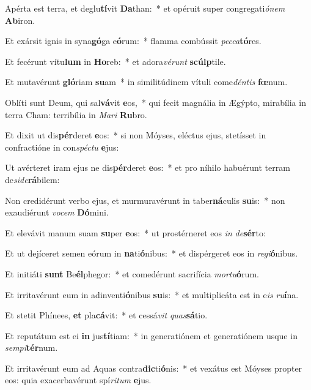 \item Apérta est terra, et deglu\textbf{tí}vit \textbf{Da}than:~* et opéruit super congregati\textit{ó}\textit{nem} \textbf{Ab}iron.
\item Et exársit ignis in syna\textbf{gó}ga e\textbf{ó}rum:~* flamma combússit \textit{pec}\textit{ca}\textbf{tó}res.
\item Et fecérunt vítu\textbf{lum} in \textbf{Ho}reb:~* et adora\textit{vé}\textit{runt} \textbf{scúlp}tile.
\item Et mutavérunt \textbf{gló}riam \textbf{su}am~* in similitúdinem vítuli come\textit{dén}\textit{tis} \textbf{fœ}num.
\item Oblíti sunt Deum, qui sal\textbf{vá}vit \textbf{e}os,~* qui fecit magnália in Ægýpto, mirabília in terra Cham: terribília in \textit{Ma}\textit{ri} \textbf{Ru}bro.
\item Et dixit ut dis\textbf{pér}deret \textbf{e}os:~* si non Móyses, eléctus ejus, stetísset in confractióne in con\textit{spéc}\textit{tu} \textbf{e}jus:
\item Ut avérteret iram ejus ne dis\textbf{pér}deret \textbf{e}os:~* et pro níhilo habuérunt terram de\textit{si}\textit{de}\textbf{rá}bilem:
\item Non credidérunt verbo ejus, et murmuravérunt in taber\textbf{ná}culis \textbf{su}is:~* non exaudiérunt \textit{vo}\textit{cem} \textbf{Dó}mini.
\item Et elevávit manum suam \textbf{su}per \textbf{e}os:~* ut prostérneret eos \textit{in} \textit{de}\textbf{sér}to:
\item Et ut dejíceret semen eórum in \textbf{na}ti\textbf{ó}nibus:~* et dispérgeret eos in \textit{re}\textit{gi}\textbf{ó}nibus.
\item Et initiáti \textbf{sunt} Be\textbf{él}phegor:~* et comedérunt sacrifícia \textit{mor}\textit{tu}\textbf{ó}rum.
\item Et irritavérunt eum in adinventi\textbf{ó}nibus \textbf{su}is:~* et multiplicáta est in e\textit{is} \textit{ru}\textbf{í}na.
\item Et stetit Phínees, \textbf{et} pla\textbf{cá}vit:~* et cessá\textit{vit} \textit{quas}\textbf{sá}tio.
\item Et reputátum est ei \textbf{in} jus\textbf{tí}tiam:~* in generatiónem et generatiónem usque in \textit{sem}\textit{pi}\textbf{tér}num.
\item Et irritavérunt eum ad Aquas contra\textbf{dic}ti\textbf{ó}nis:~* et vexátus est Móyses propter eos: quia exacerbavérunt spí\textit{ri}\textit{tum} \textbf{e}jus.
